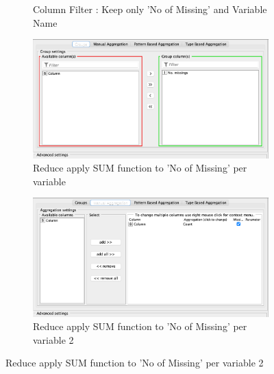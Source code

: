 \documentclass[11pt]{article}
\begin{document}
\begin{figure}[H]
\begin{subfigure}{0.4\textwidth}
					\caption{Column Filter : Keep only 'No of Missing' and Variable Name}
					\label{fig:second}
				\end{subfigure}
				\hfill
				\begin{subfigure}{0.4\textwidth}
					\includegraphics[width=\textwidth]{res/t0/t01/t01-groupby-conf-1}
					\caption{Reduce apply SUM function to 'No of Missing' per variable}
					\label{fig:third}
				\end{subfigure}	
				\hfill
				\begin{subfigure}{0.4\textwidth}
					\includegraphics[width=\textwidth]{res/t0/t01/t01-groupby-conf-2}
					\caption{Reduce apply SUM function to 'No of Missing' per variable 2}
					\label{fig:third}
				\end{subfigure}	
				\label{fig:figures}
			\end{figure}
			\fi
			
\end{document}
